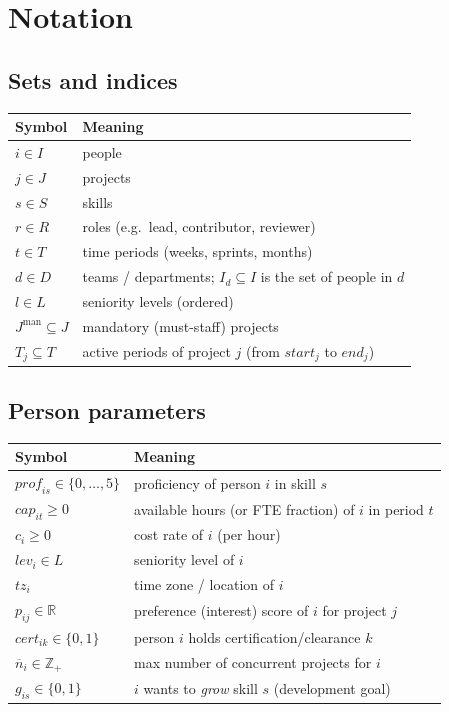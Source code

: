 \documentclass[11pt]{article}
\newcommand{\R}{\mathbb{R}}
\newcommand{\B}{\{0,1\}}
\theoremstyle{remark}
\begin{document}
\section{Notation}

\subsection{Sets and indices}

\begin{center}
\begin{tabular}{ll}
\toprule
Symbol & Meaning \\
\midrule
$i \in I$ & people \\
$j \in J$ & projects \\
$s \in S$ & skills \\
$r \in R$ & roles (e.g.\ lead, contributor, reviewer) \\
$t \in T$ & time periods (weeks, sprints, months) \\
$d \in D$ & teams / departments; $I_d \subseteq I$ is the set of people in $d$ \\
$l \in L$ & seniority levels (ordered) \\
$J^{\mathrm{man}} \subseteq J$ & mandatory (must-staff) projects \\
$T_j \subseteq T$ & active periods of project $j$ (from $\mathit{start}_j$ to $\mathit{end}_j$) \\
\bottomrule
\end{tabular}
\end{center}

\subsection{Person parameters}

\begin{center}
\begin{tabular}{ll}
\toprule
Symbol & Meaning \\
\midrule
$\mathit{prof}_{is} \in \{0,\dots,5\}$ & proficiency of person $i$ in skill $s$ \\
$\mathit{cap}_{it} \ge 0$ & available hours (or FTE fraction) of $i$ in period $t$ \\
$c_i \ge 0$ & cost rate of $i$ (per hour) \\
$\mathit{lev}_i \in L$ & seniority level of $i$ \\
$\mathit{tz}_i$ & time zone / location of $i$ \\
$p_{ij} \in \R$ & preference (interest) score of $i$ for project $j$ \\
$\mathit{cert}_{ik} \in \B$ & person $i$ holds certification/clearance $k$ \\
$\overline{n}_i \in \mathbb{Z}_{+}$ & max number of concurrent projects for $i$ \\
$g_{is} \in \B$ & $i$ wants to \emph{grow} skill $s$ (development goal) \\
\bottomrule
\end{tabular}
\end{center}
\end{document}
